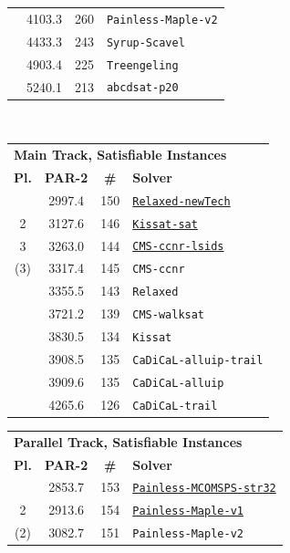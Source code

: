 \documentclass{elsarticle}
\newcommand{\solver}[1]{\texttt{#1}}
\newcommand{\solbert}[1]{\underline{\solver{#1}}}
\begin{document}
\begin{table}
\begin{tabularx}{.5\linewidth}{cccX}
   & 4103.3 & 260 & \solver{Painless-Maple-v2} \\
   & 4433.3 & 243 & \solver{Syrup-Scavel} \\
   & 4903.4 & 225 & \solver{Treengeling} \\
   & 5240.1 & 213 & \solver{abcdsat-p20} \\
\end{tabularx}
~\\[1em]
\begin{tabularx}{.47\linewidth}{cccX}
\multicolumn{4}{l}{\bf Main Track, Satisfiable Instances}\\
\bf Pl. & \bf PAR-2 & \bf \# & \bf Solver \\
\arrayrulecolor{lightgray}\hline  
 1    & 2997.4 & 150 & \solbert{Relaxed-newTech} \\
 2    & 3127.6 & 146 & \solbert{Kissat-sat} \\
 3    & 3263.0 & 144 & \solbert{CMS-ccnr-lsids} \\
(3)   & 3317.4 & 145 & \solver{CMS-ccnr} \\
      & 3355.5 & 143 & \solver{Relaxed} \\
      & 3721.2 & 139 & \solver{CMS-walksat} \\
      & 3830.5 & 134 & \solver{Kissat} \\
      & 3908.5 & 135 & \solver{CaDiCaL-alluip-trail} \\
      & 3909.6 & 135 & \solver{CaDiCaL-alluip} \\
      & 4265.6 & 126 & \solver{CaDiCaL-trail}%
\end{tabularx}\quad%
\begin{tabularx}{.5\linewidth}{cccX}
\multicolumn{4}{l}{\bf Parallel Track, Satisfiable Instances}\\
\bf Pl. & \bf PAR-2 & \bf \# & \bf Solver \\
\arrayrulecolor{lightgray}\hline
 1 & 2853.7 & 153 & \solbert{Painless-MCOMSPS-str32} \\
 2 & 2913.6 & 154 & \solbert{Painless-Maple-v1} \\
(2)& 3082.7 & 151 & \solver{Painless-Maple-v2} \\

\end{tabularx}
\end{table}
\end{document}

